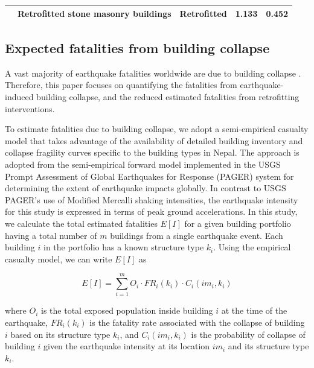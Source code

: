 \begin{table}[]
{\begin{tabular}{|c|l|c|c|c|}
    \citep{giordano2021financial} & Retrofitted stone masonry buildings      & Retrofitted    & 1.133 & 0.452 \\ \hline

\end{tabular}%
}
\end{table}            


\vspace{0.5cm} %

\subsection{Expected fatalities from building collapse}

A vast majority of earthquake fatalities worldwide are due to building collapse \citep{spence2007saving}. Therefore, this paper focuses on quantifying the fatalities from earthquake-induced building collapse, and the reduced estimated fatalities from retrofitting interventions.

To estimate fatalities due to building collapse, we adopt a semi-empirical casualty model that takes advantage of the availability of detailed building inventory and collapse fragility curves specific to the building types in Nepal. The approach is adopted from the semi-empirical forward model implemented in the USGS Prompt Assessment of Global Earthquakes for Response (PAGER) system \citep{jaiswal2011earthquake} for determining the extent of earthquake impacts globally. In contrast to USGS PAGER's use of Modified Mercalli shaking intensities, the earthquake intensity for this study is expressed in terms of peak ground accelerations. In this study, we calculate the total estimated fatalities $E[I]$ for a given building portfolio having a total number of $m$ buildings from a single earthquake event. Each building $i$ in the portfolio has a known structure type $k_{i}$. Using the empirical casualty model, we can write $E[I]$ as

    \begin{equation}\label{eq:loss_fat}
    E[I] = \sum_{i=1}^{m} O_{i} \cdot FR_{i}(k_{i}) \cdot C_{i}(im_{i}, k_{i})
    \end{equation} 

where $O_{i}$ is the total exposed population inside building $i$ at the time of the earthquake, $FR_{i}(k_{i})$ is the fatality rate associated with the collapse of building $i$ based on its structure type $k_{i}$, and $C_{i}(im_{i}, k_{i})$ is the probability of collapse of building $i$ given the earthquake intensity at its location $im_{i}$ and its structure type $k_{i}$.

